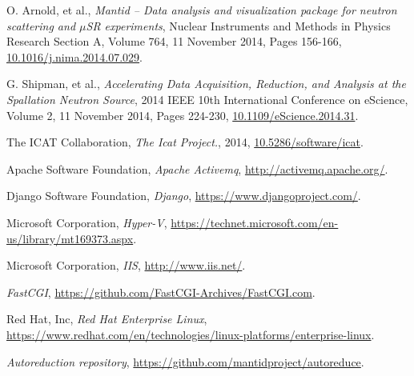 \documentclass[twocolumn]{article}
\begin{document}
\begin{thebibliography}{99}
    O. Arnold, et al.,
    \emph{Mantid -- Data analysis and visualization package for neutron scattering and $\mu$SR experiments},
    Nuclear Instruments and Methods in Physics Research Section A, Volume 764, 11 November 2014, Pages 156-166,
    \href{http://dx.doi.org/10.1016/j.nima.2014.07.029}{10.1016/j.nima.2014.07.029}.

    G. Shipman, et al.,
    \emph{Accelerating Data Acquisition, Reduction, and Analysis at the Spallation Neutron Source},
    2014 IEEE 10th International Conference on eScience, Volume 2, 11 November 2014, Pages 224-230,
    \href{http://dx.doi.org/10.1109/eScience.2014.31}{10.1109/eScience.2014.31}.
    
    The ICAT Collaboration,
    \emph{The Icat Project.},
    2014,
    \href{https://doi.org/10.5286/SOFTWARE/ICAT}{10.5286/software/icat}.
    
    Apache Software Foundation,
    \emph{Apache Activemq},
    \url{http://activemq.apache.org/}.
    
    Django Software Foundation,
    \emph{Django},
    \url{https://www.djangoproject.com/}.
    
    Microsoft Corporation,
    \emph{Hyper-V},
    \url{https://technet.microsoft.com/en-us/library/mt169373.aspx}.
    
    Microsoft Corporation,
    \emph{IIS},
    \url{http://www.iis.net/}.
    
    \emph{FastCGI},
    \url{https://github.com/FastCGI-Archives/FastCGI.com}.
    
    Red Hat, Inc,
    \emph{Red Hat Enterprise Linux},
    \url{https://www.redhat.com/en/technologies/linux-platforms/enterprise-linux}.
    
    \emph{Autoreduction repository},
    \url{https://github.com/mantidproject/autoreduce}.

    
\end{thebibliography}
\end{document}
